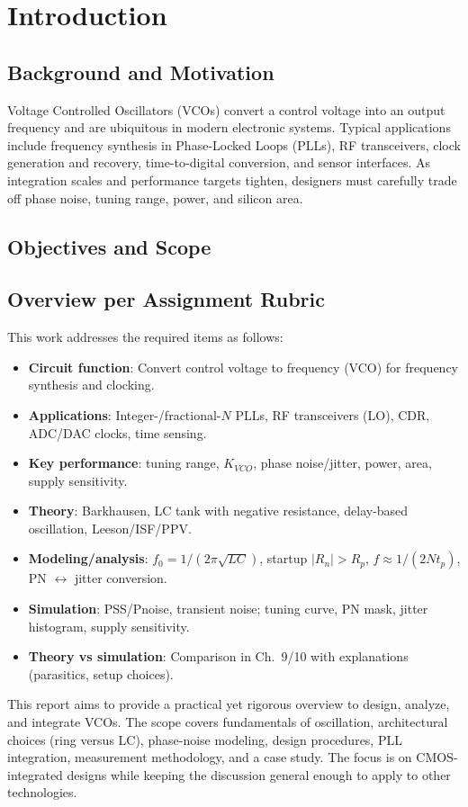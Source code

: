 \chapter{Introduction}
\section{Background and Motivation}
Voltage Controlled Oscillators (VCOs) convert a control voltage into an output frequency and are ubiquitous in modern electronic systems. Typical applications include frequency synthesis in Phase-Locked Loops (PLLs), RF transceivers, clock generation and recovery, time-to-digital conversion, and sensor interfaces. As integration scales and performance targets tighten, designers must carefully trade off phase noise, tuning range, power, and silicon area.

\section{Objectives and Scope}
\section{Overview per Assignment Rubric}
This work addresses the required items as follows:
\begin{itemize}
  \item \textbf{Circuit function}: Convert control voltage to frequency (VCO) for frequency synthesis and clocking.
  \item \textbf{Applications}: Integer-/fractional-$N$ PLLs, RF transceivers (LO), CDR, ADC/DAC clocks, time sensing.
  \item \textbf{Key performance}: tuning range, $K_{VCO}$, phase noise/jitter, power, area, supply sensitivity.
  \item \textbf{Theory}: Barkhausen, LC tank with negative resistance, delay-based oscillation, Leeson/ISF/PPV.
  \item \textbf{Modeling/analysis}: $f_0=1/(2\pi\sqrt{LC})$, startup $|R_n|>R_p$, $f\approx 1/(2Nt_p)$, PN $\leftrightarrow$ jitter conversion.
  \item \textbf{Simulation}: PSS/Pnoise, transient noise; tuning curve, PN mask, jitter histogram, supply sensitivity.
  \item \textbf{Theory vs simulation}: Comparison in Ch.~9/10 with explanations (parasitics, setup choices).
\end{itemize}

This report aims to provide a practical yet rigorous overview to design, analyze, and integrate VCOs. The scope covers fundamentals of oscillation, architectural choices (ring versus LC), phase-noise modeling, design procedures, PLL integration, measurement methodology, and a case study. The focus is on CMOS-integrated designs while keeping the discussion general enough to apply to other technologies.

